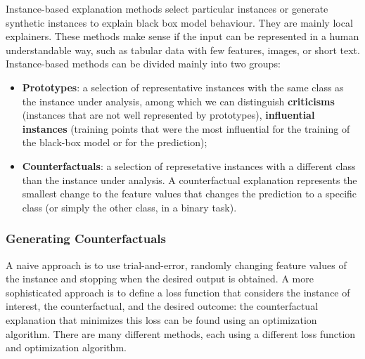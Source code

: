 Instance-based explanation methods select particular instances or generate synthetic instances to explain black box model behaviour. They are mainly local explainers. These methods make sense if the input can be represented in a human understandable way, such as tabular data with few features, images, or short text. Instance-based methods can be divided mainly into two groups:
\begin{itemize}
    \item \textbf{Prototypes}: a selection of representative instances with the same class as the instance under analysis, among which we can distinguish \textbf{criticisms} (instances that are not well represented  by prototypes), \textbf{influential instances} (training points that were the most influential for the training of the black-box model or for the prediction);
    
    \item \textbf{Counterfactuals}: a selection of represetative instances with a different class than the instance under analysis. A counterfactual explanation represents the smallest change to the feature values that changes the prediction to a specific class (or simply the other class, in a binary task).
\end{itemize}

\subsubsection{Generating Counterfactuals}

A naive approach is to use trial-and-error, randomly changing feature values of the instance and stopping when the desired output is obtained. A more sophisticated approach is to define a loss function that considers the instance of interest, the counterfactual, and the desired outcome: the counterfactual explanation that minimizes this loss can be found using an optimization algorithm. There are many different methods, each using a different loss function and optimization algorithm.

